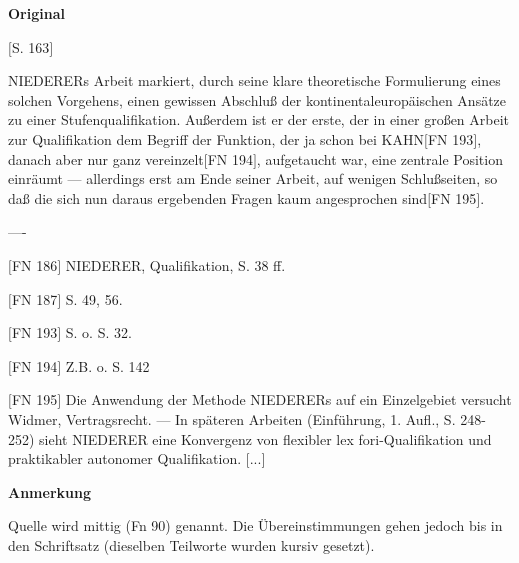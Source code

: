 \documentclass[ngerman,final,fontsize=12pt,paper=a4,twoside,bibliography=totocnumbered,BCOR=8mm,draft=false]{scrartcl}
\newenvironment{fragment}
	{\begin{snugshade}}
	{\end{snugshade}
	 \penalty-200
	 \vskip 0pt plus 10mm minus 5mm}
\newenvironment{fragmentpart}[1]
	{\noindent\textbf{#1}\par\penalty500}
	{\par}
\begin{document}
\begin{fragment}
\begin{fragmentpart}{Original \cite[S.~162,~163 Z.~25--32,~108--109,~14--21]{Weber-1986}}
{$[$S. 163$]$

NIEDERERs Arbeit markiert, durch seine klare theoretische Formulierung eines solchen Vorgehens, einen gewissen Abschluß der kontinentaleuropäischen Ansätze zu einer Stufenqualifikation. Außerdem ist er der erste, der in einer großen Arbeit zur Qualifikation dem Begriff der Funktion, der ja schon bei KAHN$[$FN 193$]$, danach aber nur ganz vereinzelt$[$FN 194$]$, aufgetaucht war, eine zentrale Position einräumt --- allerdings erst am Ende seiner Arbeit, auf wenigen Schlußseiten, so daß die sich nun daraus ergebenden Fragen kaum angesprochen sind$[$FN 195$]$.

----

$[$FN 186$]$ NIEDERER, Qualifikation, S. 38 ff.

$[$FN 187$]$ S. 49, 56.

$[$FN 193$]$ S. o. S. 32. 

$[$FN 194$]$ Z.B. o. S. 142

$[$FN 195$]$ Die Anwendung der Methode NIEDERERs auf ein Einzelgebiet versucht Widmer, Vertragsrecht. --- In späteren Arbeiten (Einführung, 1. Aufl., S. 248-252) sieht NIEDERER eine Konvergenz von flexibler lex fori-Qualifikation und praktikabler autonomer Qualifikation. $[$...$]$}
\end{fragmentpart}
\begin{fragmentpart}{Anmerkung}
Quelle wird mittig (Fn 90) genannt. Die Übereinstimmungen gehen jedoch bis in den Schriftsatz (dieselben Teilworte wurden kursiv gesetzt).
\end{fragmentpart}
\end{fragment}
\hypertarget{Lm-Fragment-080-21}{}
\end{document}
